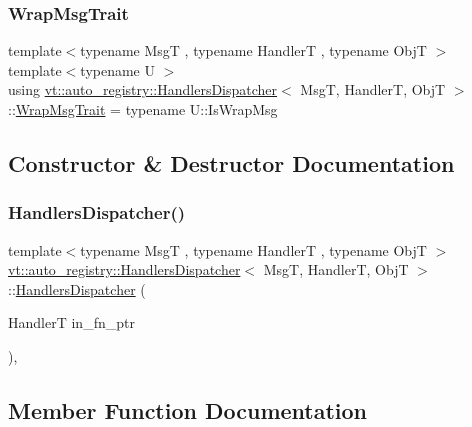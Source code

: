 \subsubsection{\texorpdfstring{Wrap\+Msg\+Trait}{WrapMsgTrait}}
{\footnotesize\ttfamily template$<$typename MsgT , typename HandlerT , typename ObjT $>$ \\
template$<$typename U $>$ \\
using \hyperlink{structvt_1_1auto__registry_1_1_handlers_dispatcher}{vt\+::auto\+\_\+registry\+::\+Handlers\+Dispatcher}$<$ MsgT, HandlerT, ObjT $>$\+::\hyperlink{structvt_1_1auto__registry_1_1_handlers_dispatcher_a316ed070238aa9a3bc8dd3f8d00109f2}{Wrap\+Msg\+Trait} =  typename U\+::\+Is\+Wrap\+Msg}



\subsection{Constructor \& Destructor Documentation}
\mbox{\label{structvt_1_1auto__registry_1_1_handlers_dispatcher_aea820469903ae2c06a6e9934d3e8d0cc}} 
\subsubsection{\texorpdfstring{Handlers\+Dispatcher()}{HandlersDispatcher()}}
{\footnotesize\ttfamily template$<$typename MsgT , typename HandlerT , typename ObjT $>$ \\
\hyperlink{structvt_1_1auto__registry_1_1_handlers_dispatcher}{vt\+::auto\+\_\+registry\+::\+Handlers\+Dispatcher}$<$ MsgT, HandlerT, ObjT $>$\+::\hyperlink{structvt_1_1auto__registry_1_1_handlers_dispatcher}{Handlers\+Dispatcher} (\begin{DoxyParamCaption}\item[{HandlerT}]{in\+\_\+fn\+\_\+ptr }\end{DoxyParamCaption})\hspace{0.3cm}{\ttfamily [inline]}, {\ttfamily [explicit]}}



\subsection{Member Function Documentation}
\mbox{\label{structvt_1_1auto__registry_1_1_handlers_dispatcher_a3139ff15aaf26b383dad67114c785b95}} 
